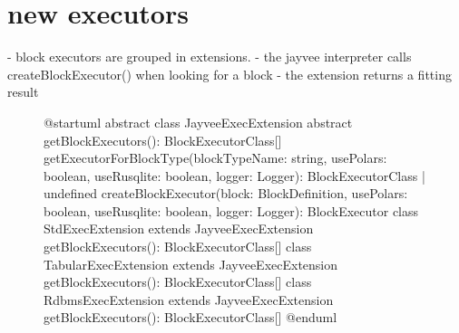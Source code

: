 \section{new executors}
- block executors are grouped in extensions.
- the jayvee interpreter calls createBlockExecutor() when looking for a block
- the extension returns a fitting result
\begin{figure}
	\begin{plantuml}
		@startuml
		abstract class JayveeExecExtension {
				{abstract} getBlockExecutors(): BlockExecutorClass[]
				getExecutorForBlockType(blockTypeName: string, usePolars: boolean, useRusqlite: boolean, logger: Logger): BlockExecutorClass | undefined
				createBlockExecutor(block: BlockDefinition, usePolars: boolean, useRusqlite: boolean, logger: Logger): BlockExecutor
			}
		class StdExecExtension extends JayveeExecExtension {
				getBlockExecutors(): BlockExecutorClass[]
			}
		class TabularExecExtension extends JayveeExecExtension {
				getBlockExecutors(): BlockExecutorClass[]
			}
		class RdbmsExecExtension extends JayveeExecExtension {
				getBlockExecutors(): BlockExecutorClass[]
			}
		@enduml
	\end{plantuml}
	\caption{} %
	\label{fig:uml:jayveeexecextension}
\end{figure}


